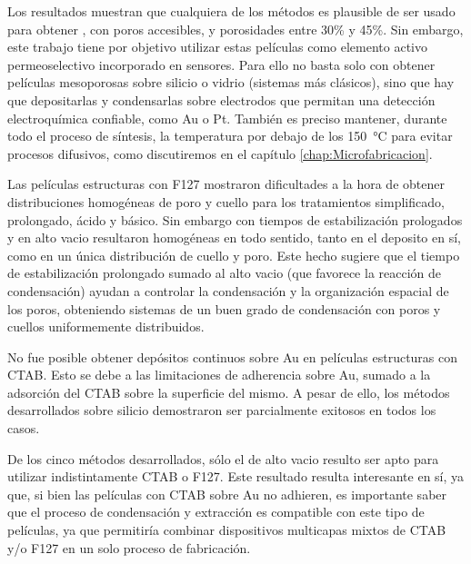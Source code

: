 	Los resultados muestran que cualquiera de los métodos es plausible de ser usado para obtener \pdm, con poros accesibles, y porosidades entre 30\% y 45\%. Sin embargo, este trabajo tiene por objetivo utilizar estas películas como elemento activo permeoselectivo incorporado en sensores. Para ello no basta solo con obtener películas mesoporosas sobre silicio o vidrio (sistemas más clásicos), sino que hay que depositarlas y condensarlas sobre electrodos que permitan una detección electroquímica confiable, como Au o Pt. También es preciso mantener, durante todo el proceso de síntesis, la temperatura por debajo de los \SI{150}{\celsius} para evitar procesos difusivos, como discutiremos en el capítulo \ref{chap:Microfabricacion}.

	Las películas estructuras con F127 mostraron dificultades a la hora de obtener distribuciones homogéneas de poro y cuello para los tratamientos simplificado, prolongado, ácido y básico. Sin embargo con tiempos de estabilización prologados y en alto vacio resultaron homogéneas en todo sentido, tanto en el deposito en sí, como en un única distribución de cuello y poro. Este hecho sugiere que el tiempo de estabilización prolongado sumado al alto vacio (que favorece la reacción de condensación) ayudan a controlar la condensación y la organización espacial de los poros, obteniendo sistemas de un buen grado de condensación con poros y cuellos uniformemente distribuidos.

	No fue posible obtener depósitos continuos sobre Au en películas estructuras con CTAB. Esto se debe a las limitaciones de adherencia sobre Au, sumado a la adsorción del CTAB sobre la superficie del mismo. A pesar de ello, los métodos desarrollados sobre silicio demostraron ser parcialmente exitosos en todos los casos.

	De los cinco métodos desarrollados, sólo el de alto vacio resulto ser apto para utilizar indistintamente CTAB o F127. Este resultado resulta interesante en sí, ya que, si bien las películas con CTAB sobre Au no adhieren, es importante saber que el proceso de condensación y extracción es compatible con este tipo de películas, ya que permitiría combinar dispositivos multicapas mixtos de CTAB y/o F127 en un solo proceso de fabricación.

